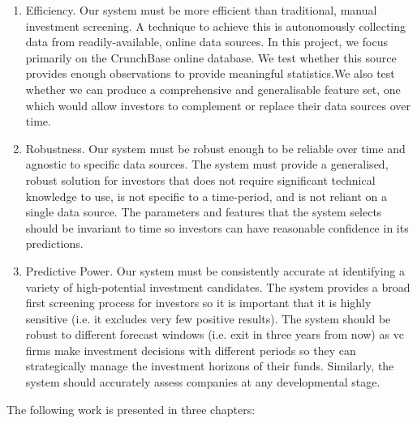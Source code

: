 \documentclass[../thesis/thesis.tex]{subfiles}
\begin{document}
\begin{enumerate}

\item Efficiency. Our system must be more efficient than traditional, manual investment screening. A technique to achieve this is autonomously collecting data from readily-available, online data sources. In this project, we focus primarily on the CrunchBase online database. We test whether this source provides enough observations to provide meaningful statistics.We also test whether we can produce a comprehensive and generalisable feature set, one which would allow investors to complement or replace their data sources over time.

\item Robustness. Our system must be robust enough to be reliable over time and agnostic to specific data sources. The system must provide a generalised, robust solution for investors that does not require significant technical knowledge to use, is not specific to a time-period, and is not reliant on a single data source. The parameters and features that the system selects should be invariant to time so investors can have reasonable confidence in its predictions.

\item Predictive Power. Our system must be consistently accurate at identifying a variety of high-potential investment candidates. The system provides a broad first screening process for investors so it is important that it is highly sensitive (i.e. it excludes very few positive results). The system should be robust to different forecast windows (i.e. exit in three years from now) as \gls{vc} firms make investment decisions with different periods so they can strategically manage the investment horizons of their funds. Similarly, the system should accurately assess companies at any developmental stage.

\end{enumerate}

The following work is presented in three chapters:
\end{document}
